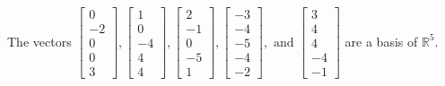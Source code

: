 \begin{exercise}
\begin{exerciseStatement}
  \end{exerciseStatement}
  \begin{exerciseAnswer}
   The vectors \(\left[\begin{array}{r}
0 \\
-2 \\
0 \\
0 \\
3
\end{array}\right] , \left[\begin{array}{r}
1 \\
0 \\
-4 \\
4 \\
4
\end{array}\right] , \left[\begin{array}{r}
2 \\
-1 \\
0 \\
-5 \\
1
\end{array}\right] , \left[\begin{array}{r}
-3 \\
-4 \\
-5 \\
-4 \\
-2
\end{array}\right] , \text{ and } \left[\begin{array}{r}
3 \\
4 \\
4 \\
-4 \\
-1
\end{array}\right]\) 
  	 are  a basis of \(\mathbb{R}^5\).
  


  \end{exerciseAnswer}
\end{exercise}